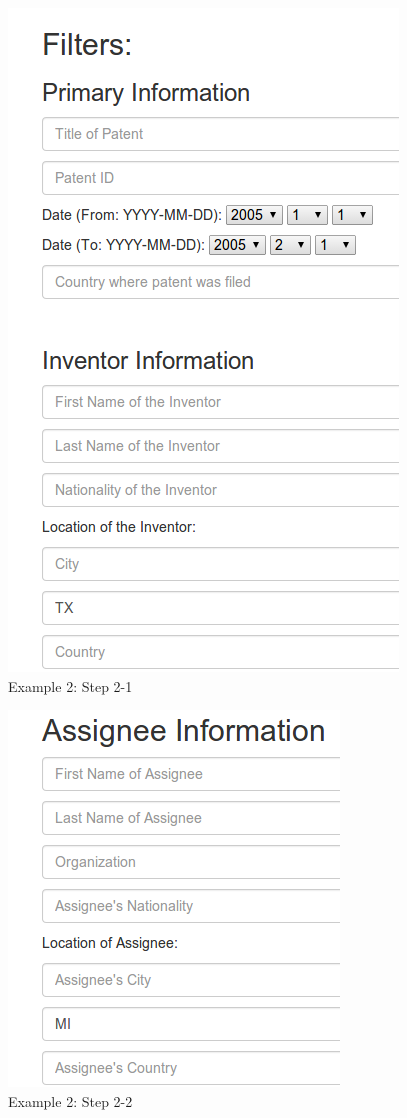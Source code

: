 \begin{figure}
\center
\includegraphics[width=.8\textwidth]{figs/ex2s2-1}
\caption{Example 2: Step 2-1}
\label{fig:Step 2}
\end{figure}

\begin{figure}
\center
\includegraphics[width=.8\textwidth]{figs/ex2s2-2}
\caption{Example 2: Step 2-2}
\label{fig:Step 3}
\end{figure}

